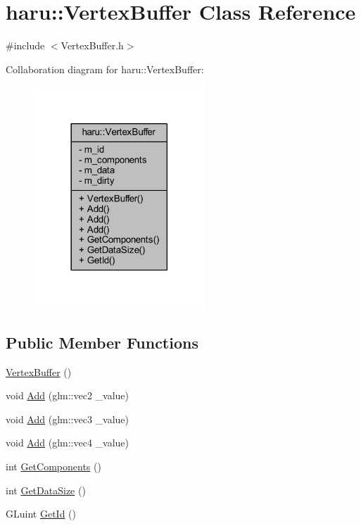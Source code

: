 \hypertarget{classharu_1_1_vertex_buffer}{}\section{haru\+:\+:Vertex\+Buffer Class Reference}
\label{classharu_1_1_vertex_buffer}


{\ttfamily \#include $<$Vertex\+Buffer.\+h$>$}



Collaboration diagram for haru\+:\+:Vertex\+Buffer\+:\nopagebreak
\begin{figure}[H]
\begin{center}
\leavevmode
\includegraphics[width=182pt]{classharu_1_1_vertex_buffer__coll__graph}
\end{center}
\end{figure}
\subsection*{Public Member Functions}
\begin{DoxyCompactItemize}
\item 
\mbox{\hyperlink{classharu_1_1_vertex_buffer_a97d2aa926c9d0f52e23687a7f283744f}{Vertex\+Buffer}} ()
\item 
void \mbox{\hyperlink{classharu_1_1_vertex_buffer_a5342e907f32b100831c4380086ecbd32}{Add}} (glm\+::vec2 \+\_\+value)
\item 
void \mbox{\hyperlink{classharu_1_1_vertex_buffer_a1494c4813a370bc9cefa125d1f6ecfda}{Add}} (glm\+::vec3 \+\_\+value)
\item 
void \mbox{\hyperlink{classharu_1_1_vertex_buffer_a6f121147bd44ce3c9a8487a3c9650262}{Add}} (glm\+::vec4 \+\_\+value)
\item 
int \mbox{\hyperlink{classharu_1_1_vertex_buffer_a8f98140e1a99aa3490189914d1498031}{Get\+Components}} ()
\item 
int \mbox{\hyperlink{classharu_1_1_vertex_buffer_aa5e656255932e3be2d53ba4ab1165667}{Get\+Data\+Size}} ()
\item 
G\+Luint \mbox{\hyperlink{classharu_1_1_vertex_buffer_a9cf4caf3c2221d4229d1d263979ac74a}{Get\+Id}} ()
\end{DoxyCompactItemize}
